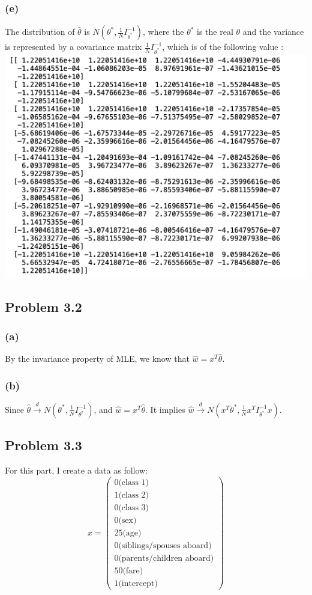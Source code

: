 \documentclass{article}
\begin{document}
\subsubsection*{(e)}
	The distribution of $\hat{\theta}$ is $N(\theta^*, \frac{1}{N}I^{-1}_{\theta^{*}})$, where the $\theta^*$ is the real $\theta$ and the variance is represented by a covariance matrix $\frac{1}{N}I^{-1}_{\theta^{*}}$, which is of the following  value :
	\includegraphics[scale=0.5]{fisher}
	
\subsection*{Problem 3.2}
\subsubsection*{(a)}
	By the invariance property of MLE, we know that  $\hat{w} = x^T\hat{\theta}$.
\subsubsection*{(b)}
	Since  $\hat{\theta}  \xrightarrow[]{d} N(\theta^*, \frac{1}{N}I^{-1}_{\theta^{*}})$, and $\hat{w} = x^T\hat{\theta}$. It implies  $\hat{w}  \xrightarrow[]{d} N(x^{T}\theta^*, \frac{1}{N}x^{T}I^{-1}_{\theta^{*}}x)$.

\subsection*{Problem 3.3}
	For this part, I create a data as follow:
	\begin{equation*}
		x=  \begin{pmatrix} 0\text{(class 1)}\\1 \text{(class 2)}\\ 0 \text{(class 3)}\\ 0 \text{(sex)}\\ 25\text{(age)}\\ 0\text{(siblings/spouses aboard)}\\0\text{(parents/children aboard)}\\ 50\text{(fare)}\\1\text{(intercept)} \end{pmatrix} 	\end{equation*}
\end{document}
